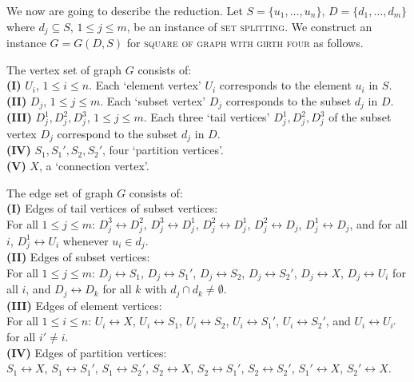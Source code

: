 \documentclass[proceedings]{stacs}
\newlength{\ai}
\begin{document}
We now are going to describe the reduction.
Let $S=\{u_1, \ldots, u_n\}$, $D=\{d_1, \ldots, d_m\}$ where $d_j\subseteq S$, $1\le j \le m$,
be an instance of \textsc{set splitting}. We construct an instance $G=G(D, S)$ for
\textsc{square of graph with girth four} as follows.

The vertex set of graph $G$ consists of:\\
\textbf{(I)} $U_i$, $1\le i\le n$. Each `element vertex' $U_i$ corresponds to the element $u_i$ in $S$.\\
\textbf{(II)} $D_j$, $1\le j\le m$. Each `subset vertex' $D_j$ corresponds to the subset $d_j$ in $D$.\\
\textbf{(III)} $D_j^1, D_j^2, D_j^3$, $1\le j\le m$. Each three `tail vertices' $D_j^1, D_j^2, D_j^3$ of
       the subset vertex $D_j$ correspond to the subset $d_j$ in $D$.\\
\textbf{(IV)} $S_1, S_1', S_2, S_2'$, four `partition vertices'.\\
\textbf{(V)} $X$, a `connection vertex'.

The edge set of graph $G$ consists of:\\
\textbf{(I)} Edges of tail vertices of subset vertices:\\
       For all $1\le j\le m$: $D_j^3\leftrightarrow D_j^2$, $D_j^3\leftrightarrow D_j^1$, $D_j^2\leftrightarrow D_j^1$, $D_j^2\leftrightarrow D_j$,
       $D_j^1\leftrightarrow D_j$, and for all $i$, $D_j^1\leftrightarrow U_i$ whenever $u_i\in d_j$.\\
\textbf{(II)} Edges of subset vertices:\\
       For all $1\le j\le m$: $D_j\leftrightarrow S_1$, $D_j\leftrightarrow S_1'$, $D_j\leftrightarrow S_2$, $D_j\leftrightarrow S_2'$,
       $D_j\leftrightarrow X$, $D_j\leftrightarrow U_i$ for all $i$, and $D_j\leftrightarrow D_k$ for all $k$ with $d_j\cap d_k\not=\emptyset$.\\
\textbf{(III)} Edges of element vertices:\\
       For all $1\le i\le n$: $U_i\leftrightarrow X$, $U_i\leftrightarrow S_1$, $U_i\leftrightarrow S_2$, $U_i\leftrightarrow S_1'$, $U_i\leftrightarrow S_2'$,
       and $U_i\leftrightarrow U_{i'}$ for all $i'\not= i$.\\
\textbf{(IV)} Edges of partition vertices:\\
       $S_1\leftrightarrow X$, $S_1\leftrightarrow S_1'$, $S_1\leftrightarrow S_2'$,
       $S_2\leftrightarrow X$, $S_2\leftrightarrow S_1'$, $S_2\leftrightarrow S_2'$,
       $S_1'\leftrightarrow X$, $S_2'\leftrightarrow X$.
\end{document}
